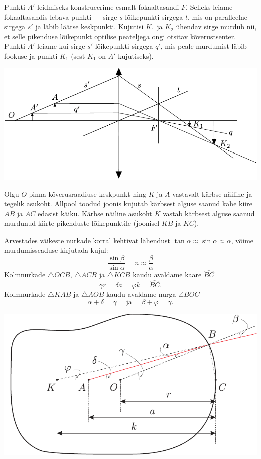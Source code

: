 \documentclass[10pt, twoside]{article}
\begin{document}
{Punkti $A'$ leidmiseks konstrueerime esmalt fokaaltasandi $F$. Selleks leiame fokaaltasandis lebava punkti --- sirge $s$ lõikepunkti sirgega $t$, mis on paralleelne sirgega $s'$ ja läbib läätse keskpunkti. Kujutisi $K_1$ ja $K_2$ ühendav sirge murdub nii, et selle pikenduse lõikepunkt optilise peateljega ongi otsitav kõverustsenter. Punkti $A'$ leiame kui sirge $s'$ lõikepunkti sirgega $q'$, mis peale murdumist läbib fookuse ja punkti $K_1$ (sest $K_1$ on $A'$ kujutiseks).


\begin{center}
	\includegraphics[width=\linewidth]{2007-v3g-09-lah}
\end{center}
\probend
\bigskip


\solu
Olgu $O$ pinna kõverusraadiuse keskpunkt ning $K$ ja $A$ vastavalt kärbse näiline ja tegelik asukoht. Allpool toodud joonis kujutab kärbsest alguse saanud kahe kiire $AB$ ja $AC$ edasist käiku. Kärbse näiline asukoht $K$ vastab kärbsest alguse saanud murdunud kiirte pikenduste lõikepunktile (joonisel $KB$ ja $KC$).

Arvestades väikeste nurkade korral kehtivat lähendust $\tan \alpha \approx \sin \alpha \approx \alpha$, võime murdumisseaduse kirjutada kujul:
\[
\frac{\sin \beta}{\sin \alpha}=n \approx \frac{\beta}{\alpha}
\]
Kolmnurkade $\triangle OCB$, $\triangle ACB$ ja $\triangle KCB$ kaudu avaldame kaare $\widehat{BC}$
\[
\gamma r=\delta a=\varphi k=\widehat{BC}.
\]
Kolmnurkade $\triangle KAB$ ja $\triangle AOB$ kaudu avaldame nurga $\angle BOC$
\[
\alpha+\delta=\gamma \quad \text { ja } \quad \beta+\varphi=\gamma.
\]

\begin{center}
	\includegraphics[width=\linewidth]{2008-v2g-10-lah}
\end{center}

}
\end{document}
